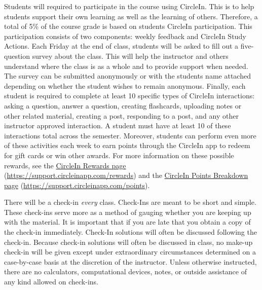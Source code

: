 \documentclass[11pt,letterpaper]{article}
\begin{document}
Students will required to participate in the course using CircleIn. This is to help students support their own learning as well as the learning of others. Therefore, a total of 5\% of the course grade is based on students CircleIn participation. This participation consists of two components: weekly feedback and CircleIn Study Actions. Each Friday at the end of class, students will be asked to fill out a five-question survey about the class. This will help the instructor and others understand where the class is as a whole and to provide support when needed. The survey can be submitted anonymously or with the students name attached depending on whether the student wishes to remain anonymous. Finally, each student is required to complete at least 10 specific types of CircleIn interactions: asking a question, answer a question, creating flashcards, uploading notes or other related material, creating a post, responding to a post, and any other instructor approved interaction. A student must have at least 10 of these interactions total across the semester. Moreover, students can perform even more of these activities each week to earn points through the CircleIn app to redeem for gift cards or win other awards. For more information on these possible rewards, see the \href{https://support.circleinapp.com/rewards}{CircleIn Rewards page} (\url{https://support.circleinapp.com/rewards}) and the \href{https://support.circleinapp.com/points}{CircleIn Points Breakdown page} (\url{https://support.circleinapp.com/points}). 
\sectionbreak




There will be a check-in \textit{every} class. Check-Ins are meant to be short and simple. These check-ins serve more as a method of gauging whether you are keeping up with the material. It is important that if you are late that you obtain a copy of the check-in immediately. Check-In solutions will often be discussed following the check-in. Because check-in solutions will often be discussed in class, no make-up check-in will be given except under extraordinary circumstances determined on a case-by-case basis at the discretion of the instructor. Unless otherwise instructed, there are no calculators, computational devices, notes, or outside assistance of any kind allowed on check-ins. 
\par\vspace{0.6cm}
\end{document}

